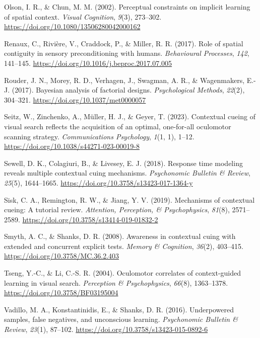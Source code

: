 \documentclass[
  man,
  floatsintext,
  longtable,
  nolmodern,
  notxfonts,
  notimes,
  colorlinks=true,linkcolor=blue,citecolor=blue,urlcolor=blue]{apa7}
\newlength{\cslhangindent}
\newenvironment{CSLReferences}[2] %
 {\begin{list}{}{%
  \setlength{\itemindent}{0pt}
  \setlength{\leftmargin}{0pt}
  \setlength{\parsep}{0pt}
  \ifodd #1
   \setlength{\leftmargin}{\cslhangindent}
   \setlength{\itemindent}{-1\cslhangindent}
  \fi
  \setlength{\itemsep}{#2\baselineskip}}}
 {\end{list}}
\begin{document}
\begin{CSLReferences}{1}{0}
Olson, I. R., \& Chun, M. M. (2002). Perceptual constraints on implicit
learning of spatial context. \emph{Visual Cognition}, \emph{9}(3),
273--302. \url{https://doi.org/10.1080/13506280042000162}

Renaux, C., Rivière, V., Craddock, P., \& Miller, R. R. (2017). Role of
spatial contiguity in sensory preconditioning with humans.
\emph{Behavioural Processes}, \emph{142}, 141--145.
\url{https://doi.org/10.1016/j.beproc.2017.07.005}

Rouder, J. N., Morey, R. D., Verhagen, J., Swagman, A. R., \&
Wagenmakers, E.-J. (2017). Bayesian analysis of factorial designs.
\emph{Psychological Methods}, \emph{22}(2), 304--321.
\url{https://doi.org/10.1037/met0000057}

Seitz, W., Zinchenko, A., Müller, H. J., \& Geyer, T. (2023). Contextual
cueing of visual search reflects the acquisition of an optimal,
one-for-all oculomotor scanning strategy. \emph{Communications
Psychology}, \emph{1}(1, 1), 1--12.
\url{https://doi.org/10.1038/s44271-023-00019-8}

Sewell, D. K., Colagiuri, B., \& Livesey, E. J. (2018). Response time
modeling reveals multiple contextual cuing mechanisms. \emph{Psychonomic
Bulletin \& Review}, \emph{25}(5), 1644--1665.
\url{https://doi.org/10.3758/s13423-017-1364-y}

Sisk, C. A., Remington, R. W., \& Jiang, Y. V. (2019). Mechanisms of
contextual cueing: {A} tutorial review. \emph{Attention, Perception, \&
Psychophysics}, \emph{81}(8), 2571--2589.
\url{https://doi.org/10.3758/s13414-019-01832-2}

Smyth, A. C., \& Shanks, D. R. (2008). Awareness in contextual cuing
with extended and concurrent explicit tests. \emph{Memory \& Cognition},
\emph{36}(2), 403--415. \url{https://doi.org/10.3758/MC.36.2.403}

Tseng, Y.-C., \& Li, C.-S. R. (2004). Oculomotor correlates of
context-guided learning in visual search. \emph{Perception \&
Psychophysics}, \emph{66}(8), 1363--1378.
\url{https://doi.org/10.3758/BF03195004}

Vadillo, M. A., Konstantinidis, E., \& Shanks, D. R. (2016).
Underpowered samples, false negatives, and unconscious learning.
\emph{Psychonomic Bulletin \& Review}, \emph{23}(1), 87--102.
\url{https://doi.org/10.3758/s13423-015-0892-6}


\end{CSLReferences}
\end{document}
